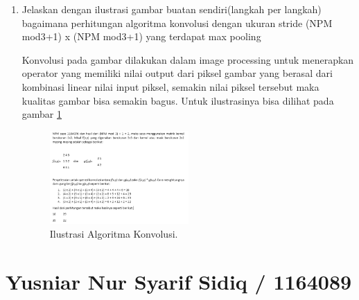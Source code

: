 \begin{enumerate}
\item Jelaskan dengan ilustrasi gambar buatan sendiri(langkah per langkah) bagaimana perhitungan algoritma konvolusi dengan ukuran stride (NPM mod3+1) x (NPM mod3+1) yang terdapat max pooling \par
Konvolusi pada gambar dilakukan dalam image processing untuk menerapkan operator yang memiliki nilai output dari piksel gambar yang berasal dari kombinasi linear nilai input piksel, semakin nilai piksel tersebut maka kualitas gambar bisa semakin bagus. Untuk ilustrasinya bisa dilihat pada gambar \ref{toke13}
		\begin{figure}[!htbp]
		\centerline{\includegraphics[width=0.5\textwidth]{figures/im/toke13.png}}
		\caption{Ilustrasi Algoritma Konvolusi.}
		\label{toke13}
		\end{figure}
\end{enumerate}


\section{Yusniar Nur Syarif Sidiq / 1164089}

